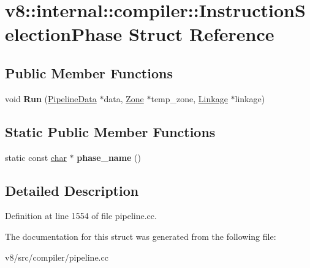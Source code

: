 \hypertarget{structv8_1_1internal_1_1compiler_1_1InstructionSelectionPhase}{}\section{v8\+:\+:internal\+:\+:compiler\+:\+:Instruction\+Selection\+Phase Struct Reference}
\label{structv8_1_1internal_1_1compiler_1_1InstructionSelectionPhase}
\subsection*{Public Member Functions}
\begin{DoxyCompactItemize}
\item 
\mbox{\label{structv8_1_1internal_1_1compiler_1_1InstructionSelectionPhase_a6b7b6b7aef09077907e768912f93468e}} 
void {\bfseries Run} (\mbox{\hyperlink{classv8_1_1internal_1_1compiler_1_1PipelineData}{Pipeline\+Data}} $\ast$data, \mbox{\hyperlink{classv8_1_1internal_1_1Zone}{Zone}} $\ast$temp\+\_\+zone, \mbox{\hyperlink{classv8_1_1internal_1_1compiler_1_1Linkage}{Linkage}} $\ast$linkage)
\end{DoxyCompactItemize}
\subsection*{Static Public Member Functions}
\begin{DoxyCompactItemize}
\item 
\mbox{\label{structv8_1_1internal_1_1compiler_1_1InstructionSelectionPhase_ae8859718046a1f186456447dddf6c928}} 
static const \mbox{\hyperlink{classchar}{char}} $\ast$ {\bfseries phase\+\_\+name} ()
\end{DoxyCompactItemize}


\subsection{Detailed Description}


Definition at line 1554 of file pipeline.\+cc.



The documentation for this struct was generated from the following file\+:\begin{DoxyCompactItemize}
\item 
v8/src/compiler/pipeline.\+cc\end{DoxyCompactItemize}
